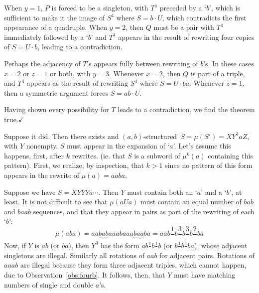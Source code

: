 \documentclass[11pt]{article}
\def\QED{$\checkmark$}
\def\ni{\noindent}
\def\s#1{\frac{#1}{}}
\def\ab{$(a,b)$}
\def\abs{\ab-structured}
\def\q#1{`$#1$'}
\def\Proof{\ni{\bf Proof:} }
\begin{document}
When $y=1$, $P$ is forced to be a singleton, with $T^4$ preceded by a \q{b}, which is sufficient to make it the image
of $S^4$ where $S=b\cdot U$, which contradicts the first appearance of a quadruple.  When $y=2$, then $Q$ must be a pair with $T^4$ immediately followed by a \q{b} and $T^4$ appears in the result of rewriting four copies of $S=U\cdot b$, leading to a contradiction.

Perhaps the adjacency of $T$'s appears fully between rewriting of $b$'s.  In these cases $x=2$ or $z=1$ or both, with
$y=3$.  Whenever $x=2$, then $Q$ is part of a triple, and $T^4$ appears as the result of rewriting $S^4$ where $S=U\cdot ba$.  Whenever $z=1$, then a symmetric argument forces $S=ab\cdot U$.

Having shown every possibility for $T$ leads to a contradiction, we find the theorem true.\QED

\ni{\bf Proof of Lemma~\ref{lem:propercurl}.}
\Proof Suppose it did.  Then there exists and \abs\ $S=\mu(S')=XY^3aZ$, with $Y$ nonempty.
$S$ must appear in the expansion of \q{a}.  Let's assume this happens, first,
after $k$ rewrites.  (ie. that $S$ is a subword of $\mu^k(a)$ containing this
pattern).   First,
we realize, by inspection, that $k>1$ since no pattern of this form appears
in the rewrite of $\mu(a)=aaba$.

Suppose we have $S=XYYYa\cdots$.  Then $Y$ must contain both an \q{a} and a \q{b},
at least.  It is not difficult to see that $\mu(aUa)$ must contain an equal
number of $bab$ and $baab$ sequences, and that they appear in pairs as
part of the rewriting of each \q{b}: $$\mu(aba)=aa\underbrace{bab}aaabaaa\underbrace{baab}a=aab\s{1}b\s{3}b\s{3}b\s{2}ba$$
\ni Now, if $Y$ is $ab$ (or $ba$), then $Y^3$ has the form $ab\s{1}b\s{1}b$
(or $b\s{1}b\s{1}ba$), whose adjacent singletons are illegal.  Similarly
all rotations of $aab$ for adjacent pairs.  Rotations of $aaab$ are illegal
because they form three adjacent triples, which cannot happen, due to Observation~\ref{obs:fourb}.  It follows, then, that $Y$ must have matching numbers
of single and double $a$'s.  
\end{document}
